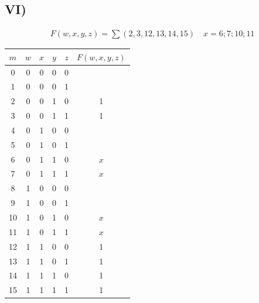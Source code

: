 \subsection{VI)}

{\large\begin{align*}\displaystyle F(w, x, y, z) = \sum(2, 3, 12, 13, 14, 15) \quad x = 6; 7; 10; 11\end{align*}}

\begin{center}
\begin{tabular}{c|cccc|c}
\rowcolor[HTML]{FFCCC9} 
\cellcolor[HTML]{9AFF99}$m$ & $w$ & $x$ & $y$ & $z$ & \cellcolor[HTML]{FFFFC7}$F(w,x,y,z)$ \\ \hline
0                           & 0   & 0   & 0   & 0   &                                      \\
1                           & 0   & 0   & 0   & 1   &                                      \\
2                           & 0   & 0   & 1   & 0   & 1                                    \\
3                           & 0   & 0   & 1   & 1   & 1                                    \\
4                           & 0   & 1   & 0   & 0   &                                      \\
5                           & 0   & 1   & 0   & 1   &                                      \\
6                           & 0   & 1   & 1   & 0   & $x$                                  \\
7                           & 0   & 1   & 1   & 1   & $x$                                  \\
8                           & 1   & 0   & 0   & 0   &                                      \\
9                           & 1   & 0   & 0   & 1   &                                      \\
10                          & 1   & 0   & 1   & 0   & $x$                                  \\
11                          & 1   & 0   & 1   & 1   & $x$                                  \\
12                          & 1   & 1   & 0   & 0   & 1                                    \\
13                          & 1   & 1   & 0   & 1   & 1                                    \\
14                          & 1   & 1   & 1   & 0   & 1                                    \\
15                          & 1   & 1   & 1   & 1   & 1                                   
\end{tabular}
\end{center}

